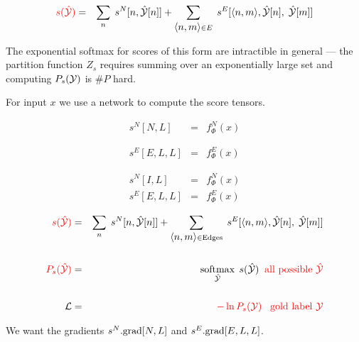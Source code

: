{

{\huge
\begin{eqnarray*}
{\color{red} s(\hat{{\cal Y}})} & = & \sum_n\;s^N[n,\hat{{\cal Y}}[n]] + \sum_{{\mbox{$\langle n,m\rangle$}} \in E}\;s^E[{\mbox{$\langle n,m\rangle$}},\hat{{\cal Y}}[n],\;\hat{{\cal Y}}[m]] \\
\end{eqnarray*}
}

\vfill
The exponential softmax for scores of this form are intractible in general --- the partition function $Z_s$ requires summing over an exponentially large set and
computing $P_s({\cal Y})$ is $\#P$ hard.


For input $x$ we use a network to compute the score tensors.

\vfill
\begin{eqnarray*}
s^N[N,L] & = & f^N_\Phi(x) \\
\\
\\
s^E[E,L,L] & = & f^E_\Phi(x)
\end{eqnarray*}


\begin{eqnarray*}
s^N[I,L] & = & f^N_\Phi(x) \\
s^E[E,L,L] & = & f^E_\Phi(x)
\end{eqnarray*}

\vfill
\begin{eqnarray*}
{\color{red} s(\hat{{\cal Y}})} & = & \sum_n\;s^N[n,\hat{{\cal Y}}[n]] + \sum_{{\mbox{$\langle n,m\rangle$}} \in \mathrm{Edges}}\;s^E[{\mbox{$\langle n,m\rangle$}},\hat{{\cal Y}}[n],\;\hat{{\cal Y}}[m]] \\
\\
{\color{red} P_s(\hat{{\cal Y}})} & = & \operatorname*{softmax}_{\hat{{\cal Y}}}\;s(\hat{{\cal Y}}) \;\;\mbox{\color{red} all possible $\hat{{\cal Y}}$} \\
\\
{\cal L} & = & {\color{red} - \ln P_s({\cal Y}) \;\;\;\mbox{gold label ${\cal Y}$}}
\end{eqnarray*}

\vfill
We want the gradients {\color{red} $s^N.\mathrm{grad}[N,L]$} and {\color{red} $s^E.\mathrm{grad}[E,L,L]$}.



}


